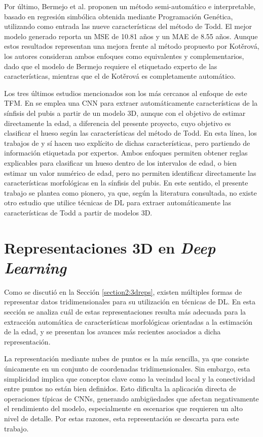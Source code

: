 Por último, Bermejo et al. \cite{bermejo_interpretable_2025} proponen un método semi-automático e interpretable, basado en regresión simbólica obtenida mediante Programación Genética, utilizando como entrada las nueve características del método de Todd. El mejor modelo generado reporta un MSE de 10.81 años y un MAE de 8.55 años. Aunque estos resultados representan una mejora frente al método propuesto por Kotěrová, los autores consideran ambos enfoques como equivalentes y complementarios, dado que el modelo de Bermejo requiere el etiquetado experto de las características, mientras que el de Kotěrová es completamente automático.

Los tres últimos estudios mencionados son los más cercanos al enfoque de este TFM. En \cite{koterova_computational_2022} se emplea una CNN para extraer automáticamente características de la sínfisis del pubis a partir de un modelo 3D, aunque con el objetivo de estimar directamente la edad, a diferencia del presente proyecto, cuyo objetivo es clasificar el hueso según las características del método de Todd. En esta línea, los trabajos de \cite{villar2017first} y \cite{bermejo_interpretable_2025} sí hacen uso explícito de dichas características, pero partiendo de información etiquetada por expertos. Ambos enfoques permiten obtener reglas explicables para clasificar un hueso dentro de los intervalos de edad, o bien estimar un valor numérico de edad, pero no permiten identificar directamente las características morfológicas en la sínfisis del pubis. En este sentido, el presente trabajo se plantea como pionero, ya que, según la literatura consultada, no existe otro estudio que utilice técnicas de DL para extraer automáticamente las características de Todd a partir de modelos 3D.

\section{Representaciones 3D en \textit{Deep Learning}}
Como se discutió en la Sección \ref{section2:3dreps}, existen múltiples formas de representar datos tridimensionales para su utilización en técnicas de DL. En esta sección se analiza cuál de estas representaciones resulta más adecuada para la extracción automática de características morfológicas orientadas a la estimación de la edad, y se presentan los avances más recientes asociados a dicha representación.

La representación mediante nubes de puntos es la más sencilla, ya que consiste únicamente en un conjunto de coordenadas tridimensionales. Sin embargo, esta simplicidad implica que conceptos clave como la vecindad local y la conectividad entre puntos no están bien definidos. Esto dificulta la aplicación directa de operaciones típicas de CNNs, generando ambigüedades que afectan negativamente el rendimiento del modelo, especialmente en escenarios que requieren un alto nivel de detalle. Por estas razones, esta representación se descarta para este trabajo.

